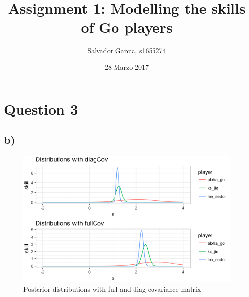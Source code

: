 \documentclass{article}
\author{Salvador Garcia, s1655274}
\date{28 Marzo 2017}
\title{Assignment 1: Modelling the skills of Go players}
\begin{document}
\maketitle
\section{Question 3}

\subsection*{b)}
\begin{figure}[ht!]
    \centering
    \includegraphics[scale=.7]{im1.png}
    \caption{Posterior distributions with full and diag covariance matrix}
    \label{fig:fig1}
\end{figure}
\end{document}
